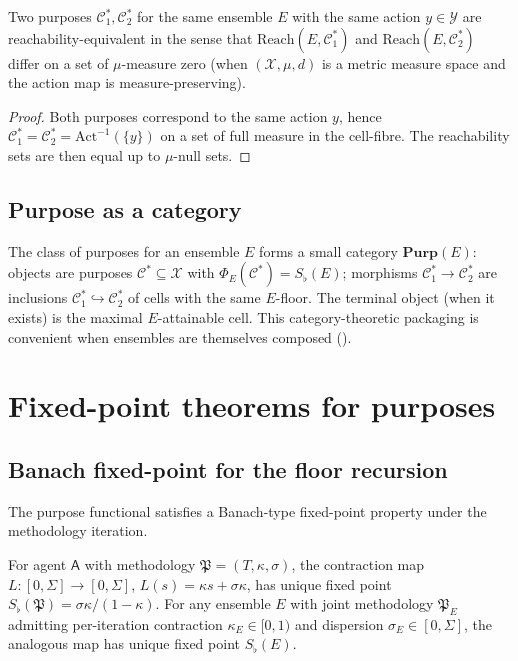 \documentclass[11pt,twocolumn,a4paper]{article}
\newcommand{\X}{\mathcal{X}}
\newcommand{\Y}{\mathcal{Y}}
\newcommand{\Cell}{\mathcal{C}}
\newcommand{\Method}{\mathfrak{P}}
\newcommand{\agent}{\mathsf{A}}
\newcommand{\Sfloor}{S_{\flat}}
\newcommand{\Action}{\mathrm{Act}}
\newcommand{\Reach}{\mathrm{Reach}}
\begin{document}
\begin{theorem}
\label{thm:purp-unique}
Two purposes $\Cell^*_1,\Cell^*_2$ for the same ensemble $E$ with the
same action $y\in\Y$ are reachability-equivalent in the sense that
$\Reach(E,\Cell^*_1)$ and $\Reach(E,\Cell^*_2)$ differ on a set of
$\mu$-measure zero (when $(\X,\mu,d)$ is a metric measure space and
the action map is measure-preserving).
\end{theorem}

\begin{proof}
Both purposes correspond to the same action $y$, hence
$\Cell^*_1=\Cell^*_2=\Action^{-1}(\{y\})$ on a set of full measure
in the cell-fibre. The reachability sets are then equal up to
$\mu$-null sets.
\end{proof}

\subsection{Purpose as a category}

\begin{remark}\label{rem:cat-purpose}
The class of purposes for an ensemble $E$ forms a
small category $\mathbf{Purp}(E)$:
objects are purposes $\Cell^*\subseteq\X$ with $\Phi_E(\Cell^*)=
\Sfloor(E)$; morphisms $\Cell^*_1\to\Cell^*_2$ are inclusions
$\Cell^*_1\hookrightarrow\Cell^*_2$ of cells with the same $E$-floor.
The terminal object (when it exists) is the maximal $E$-attainable
cell. This category-theoretic packaging is convenient when ensembles
are themselves composed ().
\end{remark}

\section{Fixed-point theorems for purposes}
\label{sec:fixedpoint}

\subsection{Banach fixed-point for the floor recursion}

The purpose functional satisfies a Banach-type
fixed-point property under the methodology iteration.

\begin{theorem}\label{thm:floor-fp}
For agent $\agent$ with methodology $\Method=(T,\kappa,\sigma)$, the
contraction map $L:[0,\Sigma]\to[0,\Sigma]$,
$L(s)=\kappa s+\sigma\kappa$, has unique fixed point
$\Sfloor(\Method)=\sigma\kappa/(1-\kappa)$. For any ensemble $E$ with
joint methodology $\Method_E$ admitting per-iteration contraction
$\kappa_E\in[0,1)$ and dispersion $\sigma_E\in[0,\Sigma]$, the
analogous map has unique fixed point $\Sfloor(E)$.
\end{theorem}
\end{document}
